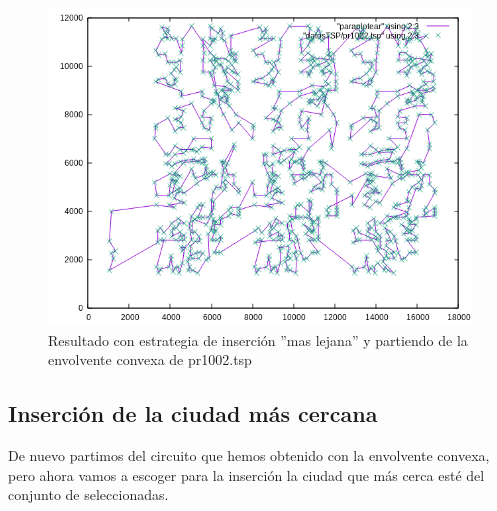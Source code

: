 \documentclass{article}
\begin{document}
	\begin{figure}[H]
	\centering
	\includegraphics[totalheight=8cm]{img/convex_first}
	\caption{Resultado con estrategia de inserción ''mas lejana'' y partiendo de la envolvente convexa de pr1002.tsp}
	\label{fig:convex_first}
	\end{figure}
	\subsection{Inserción de la ciudad más cercana}
De nuevo partimos del circuito que hemos obtenido con la envolvente convexa, pero ahora vamos a escoger para la inserción la ciudad que más cerca esté del conjunto de seleccionadas.

\
\end{document}

